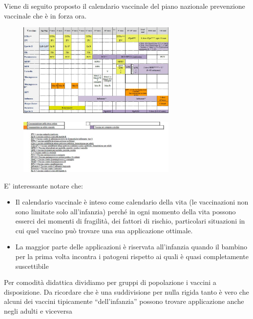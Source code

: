   Viene di seguito proposto il calendario vaccinale del piano nazionale
  prevenzione vaccinale che è in forza ora.

  \begin{figure}[!ht]
\centering
\includegraphics[width=0.7\textwidth]{06/image2.jpg}
\end{figure}

  \begin{figure}[!ht]
\centering
\includegraphics[width=0.7\textwidth]{06/image3.jpg}
\end{figure}

  E' interessante notare che:

\begin{itemize}
\item
  Il calendario vaccinale è inteso come calendario della vita (le
  vaccinazioni non sono limitate solo all'infanzia) perché in ogni
  momento della vita possono esserci dei momenti di fragilità, dei
  fattori di rischio, particolari situazioni in cui quel vaccino può
  trovare una sua applicazione ottimale.
\item
  La maggior parte delle applicazioni è riservata all'infanzia quando il
  bambino per la prima volta incontra i patogeni rispetto ai quali è
  quasi completamente suscettibile
\end{itemize}

  Per comodità didattica dividiamo per gruppi di popolazione i vaccini a
  disposizione. Da ricordare che è una suddivisione per nulla rigida
  tanto è vero che alcuni dei vaccini tipicamente ``dell'infanzia''
  possono trovare applicazione anche negli adulti e viceversa

